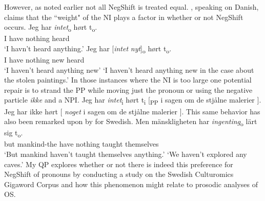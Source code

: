 \documentclass[12pt, letterpaper]{article}
\begin{document}
However, as noted earlier not all NegShift is treated equal. \citet[65f]{christensenInterfacesNegationSyntax2005}, speaking on Danish, claims that the ``weight" of the NI plays a factor in whether or not NegShift occurs. 
	\ea
		\ea 
		\gll Jeg har \textit{intet}\textsubscript{o} hørt t\textsubscript{o}.\\
		I have nothing heard\\
		\glt  `I havn't heard anything.'
		\ex 
		\gll Jeg har [\textit{intet} \textit{nyt}]\textsubscript{o} hørt t\textsubscript{o}.\\
		I have nothing new heard\\
		\glt `I haven't heard anything new'
		\glt `I haven't heard anything new in the case about the stolen paintings.'
		\z 
	\z
In those instances where the NI is too large one potential repair is to strand the PP while moving just the pronoun or using the negative particle \textit{ikke} and a NPI.
	\ea Jeg har \textit{intet}\textsubscript{i} hørt t\textsubscript{i} [\textsubscript{PP} i sagen om de stjålne malerier ].
	\ex Jeg har ikke hørt [ \textit{noget} i sagen om de stjålne malerier ].
	\z   
This same behavior has also been remarked upon by \citet{penkaNegativeIndefinites2011} for Swedish.
	\ea 
	\gll Men mänskligheten har \textit{ingenting}\textsubscript{o} lärt sig t\textsubscript{o}.\\
	but mankind-the have nothing taught themselves\\
	\glt `But mankind haven't taught themselves anything.'
	\glt `We haven't explored any caves.'
	\z 
My QP explores whether or not there is indeed this preference for NegShift of pronouns by conducting a study on the Swedish Culturomics Gigaword Corpus \citep{eideSwedishCulturomicsGigaword2016} and how this phenomenon might relate to prosodic analyses of OS.
\end{document}
